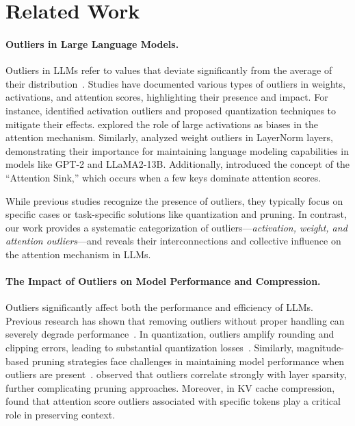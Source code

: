 \section{Related Work}
\label{sec:related}
\vspace{-0.5mm}
\paragraph{Outliers in Large Language Models.}\label{subsec:related-outlier}
Outliers in LLMs refer to values that deviate significantly from the average of their distribution~\citep{dettmers2022gpt3}. Studies have documented various types of outliers in weights, activations, and attention scores, highlighting their presence and impact. For instance, \citet{dettmers2022gpt3} identified activation outliers and proposed quantization techniques to mitigate their effects. \citet{sun2024massive} explored the role of large activations as biases in the attention mechanism. Similarly, \citet{zhang2024unveiling} analyzed weight outliers in LayerNorm layers, demonstrating their importance for maintaining language modeling capabilities in models like GPT-2 and LLaMA2-13B. Additionally, \citet{xiao2023efficient} introduced the concept of the “Attention Sink,” which occurs when a few keys dominate attention scores.

While previous studies recognize the presence of outliers, they typically focus on specific cases or task-specific solutions like quantization and pruning. In contrast, our work provides a systematic categorization of outliers—\emph{activation, weight, and attention outliers}—and reveals their interconnections and collective influence on the attention mechanism in LLMs.

\vspace{-0.5mm}
\paragraph{The Impact of Outliers on Model Performance and Compression.}\label{subsec:related-influence}
Outliers significantly affect both the performance and efficiency of LLMs. Previous research has shown that removing outliers without proper handling can severely degrade performance~\citep{puccetti2021bert, kovaleva2021bert, zhang2024unveiling}. In quantization, outliers amplify rounding and clipping errors, leading to substantial quantization losses~\citep{wei2022outlier, nrusimha2024mitigating, lin2024rotation}. Similarly, magnitude-based pruning strategies face challenges in maintaining model performance when outliers are present~\citep{sun2023simple}. \citet{yin2023outlier} observed that outliers correlate strongly with layer sparsity, further complicating pruning approaches. Moreover, in KV cache compression, \citet{xiao2023efficient} found that attention score outliers associated with specific tokens play a critical role in preserving context.


